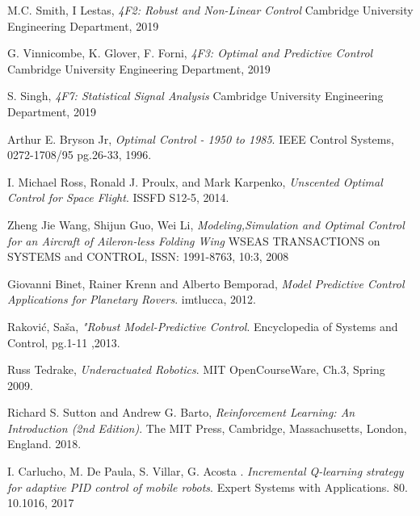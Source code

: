 \documentclass[../main.tex]{subfiles}
\begin{document}
\renewcommand{\bibname}{References}
\begin{thebibliography}{9}
        M.C. Smith, I Lestas,
        \emph{4F2: Robust and Non-Linear Control}
        Cambridge University Engineering Department, 2019

        G. Vinnicombe, K. Glover, F. Forni,
        \emph{4F3: Optimal and Predictive Control}
        Cambridge University Engineering Department, 2019

        S. Singh,
        \emph{4F7: Statistical Signal Analysis}
        Cambridge University Engineering Department, 2019

        Arthur E. Bryson Jr,
        \emph{Optimal Control - 1950 to 1985}.
        IEEE Control Systems, 0272-1708/95 pg.26-33, 1996.

        I. Michael Ross, Ronald J. Proulx, and Mark Karpenko,
        \emph{Unscented Optimal Control for Space Flight}.
        ISSFD S12-5, 2014.

        Zheng Jie Wang, Shijun Guo, Wei Li,
        \emph{Modeling,Simulation and Optimal Control for an Aircraft of
        Aileron-less Folding Wing}
        WSEAS TRANSACTIONS on SYSTEMS and CONTROL, ISSN: 1991-8763, 10:3, 2008

        Giovanni Binet, Rainer Krenn and Alberto Bemporad,
        \emph{Model Predictive Control Applications for Planetary Rovers}.
        imtlucca, 2012.

        Rakovi{\'{c}}, Sa{\v{s}}a,
        \emph{"Robust Model-Predictive Control}.
        Encyclopedia of Systems and Control, pg.1-11 ,2013.

        Russ Tedrake,
        \emph{Underactuated Robotics}.
        MIT OpenCourseWare, Ch.3, Spring 2009.

        Richard S. Sutton and Andrew G. Barto,
        \emph{Reinforcement Learning: An Introduction (2nd Edition)}.
        The MIT Press, Cambridge, Massachusetts, London, England. 2018.

        I. Carlucho, M. De Paula, S. Villar, G. Acosta . \emph{Incremental Q-learning strategy for adaptive PID control of mobile robots}. 
        Expert Systems with Applications. 80. 10.1016, 2017


\end{thebibliography}
\end{document}
